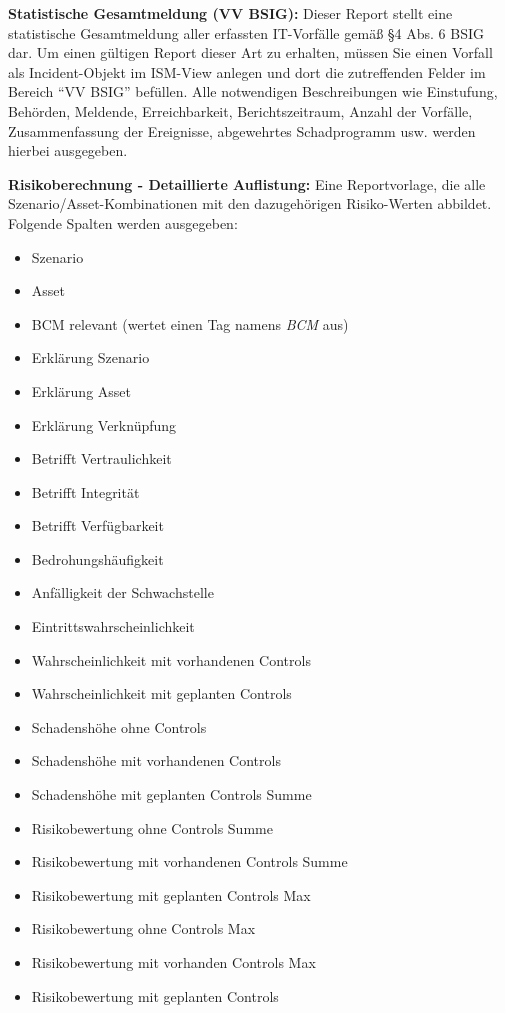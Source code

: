 \documentclass[a4paper,10pt]{book}
\begin{document}
\textbf{Statistische Gesamtmeldung (VV BSIG):} Dieser Report stellt eine
statistische Gesamtmeldung aller erfassten IT-Vorfälle gemäß §4 Abs. 6 BSIG dar.
Um einen gültigen Report dieser Art zu erhalten, müssen Sie einen Vorfall als
Incident-Objekt im ISM-View anlegen und dort die zutreffenden Felder im Bereich
``VV BSIG'' befüllen. Alle notwendigen Beschreibungen wie Einstufung, Behörden,
Meldende, Erreichbarkeit, Berichtszeitraum, Anzahl der Vorfälle, Zusammenfassung
der Ereignisse, abgewehrtes Schadprogramm usw. werden hierbei ausgegeben.

\textbf{Risikoberechnung - Detaillierte Auflistung:} Eine Reportvorlage, die
alle Szenario/Asset-Kombinationen mit den dazugehörigen Risiko-Werten abbildet.
Folgende Spalten werden ausgegeben:

\begin{itemize}
\item Szenario
\item Asset
\item BCM relevant (wertet einen Tag namens \textit{BCM} aus)
\item Erklärung Szenario
\item Erklärung Asset
\item Erklärung Verknüpfung
\item Betrifft Vertraulichkeit
\item Betrifft Integrität
\item Betrifft Verfügbarkeit
\item Bedrohungshäufigkeit
\item Anfälligkeit der Schwachstelle
\item Eintrittswahrscheinlichkeit
\item Wahrscheinlichkeit mit vorhandenen Controls
\item Wahrscheinlichkeit mit geplanten Controls
\item Schadenshöhe ohne Controls
\item Schadenshöhe mit vorhandenen Controls
\item Schadenshöhe mit geplanten Controls Summe
\item Risikobewertung ohne Controls Summe
\item Risikobewertung mit vorhandenen Controls Summe
\item Risikobewertung mit geplanten Controls Max
\item Risikobewertung ohne Controls Max
\item Risikobewertung mit vorhanden Controls Max
\item Risikobewertung mit geplanten Controls

\end{itemize}
\end{document}
